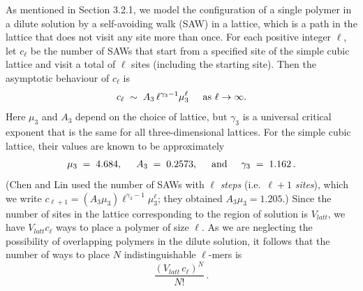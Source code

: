 \documentclass[journal=mamobx,manuscript=article]{achemso}
\begin{document}
As mentioned in Section 3.2.1, we model the configuration of a single  polymer in a dilute solution by a self-avoiding walk (SAW) in a lattice, which is a path in the lattice that does not visit any site more than once.
For each positive integer $\ell$, let $c_{\ell}$ be
the number of SAWs that start from a specified site of the simple cubic lattice and visit a total of $\ell$ sites (including the starting site).
Then the asymptotic behaviour of $c_{\ell}$ 
is\cite{Madras2013} 
\begin{equation}
    \label{eq.sawscale}
       c_{\ell}  \;\sim  \;  A_3 \, {\ell}^{\gamma_3-1}  \mu_3^{\ell}    \hspace{5mm}\hbox{as $\ell\rightarrow\infty$}.
\end{equation}
Here $\mu_3$ and $A_3$ depend on the choice of lattice, but $\gamma_3$ is a universal critical exponent
that is the same for all three-dimensional lattices.  
For the simple cubic lattice, 
their values are known to be approximately \cite{Chen2002,Madras2013}
\begin{equation}
   \label{eq.gammas}   \mu_3 \;=\;  4.684, \hspace{5mm}
        A_3 \;=\;  0.2573,    \hspace{5mm}\hbox{and}\hspace{5mm}
   \gamma_3 \;=\;  1.162 \,.  %
\end{equation}
(Chen and Lin\cite{Chen2002} used the 
number of SAWs with $\ell$ \textit{steps} (i.e.\ $\ell+1$ \textit{sites}), which we write  $c_{\ell+1}=(A_3\mu_3)\ell^{\gamma_3-1}\mu_3^{\ell}$; %
they obtained $A_3\mu_3=1.205$.)
Since the number of sites in the lattice corresponding to the region of solution is $V_{latt}$, 
we have $V_{latt}c_{\ell}$ ways to place a polymer of size ${\ell}$.  As we are neglecting the
possibility of overlapping polymers in the dilute solution, it follows that the number of ways to 
place $N$ indistinguishable $\ell$-mers is 
\begin{equation}
  \label{eq.Npoly}
   \frac{(V_{latt}\,c_{\ell})^N}{N!}  \,.   
\end{equation}
\end{document}
